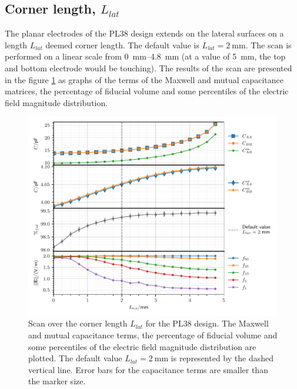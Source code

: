 \subsection{Corner length, $L_{lat}$}

The planar electrodes of the PL38 design extends on the lateral surfaces on a length $L_{lat}$ deemed corner length. The default value is $L_{lat} = \SI{2}{\mm}$. The scan is performed on a linear scale from \SIrange{0}{4.8}{\mm} (at a value of \SI{5}{\mm}, the top and bottom electrode would be touching). The results of the scan are presented in the figure \ref{fig:capacitance-fiducial-corner-length} as graphs of the terms of the Maxwell and mutual capacitance matrices, the percentage of fiducial volume and some percentiles of the electric field magnitude distribution.

\begin{figure}
\centering
\includegraphics[scale=1]{Figures/ElectrodesScan/capacitance_fiducial_corner_length.pdf}
\caption{Scan over the corner length $L_{lat}$ for the PL38 design. The Maxwell and mutual capacitance terms, the percentage of fiducial volume and some percentiles of the electric field magnitude distribution are plotted. The default value $L_{lat}=\SI{2}{\mm}$ is represented by the dashed vertical line. Error bars for the capacitance terms are smaller than the marker size.}
\label{fig:capacitance-fiducial-corner-length}
\end{figure}

